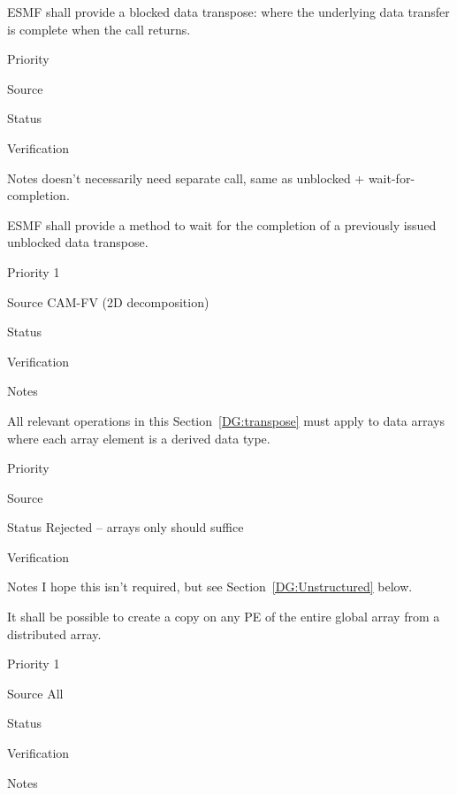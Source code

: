 
ESMF shall provide a blocked data transpose: where the underlying
data transfer is complete when the call returns.

\begin{reqlist}
\item[Priority]
\item[Source]
\item[Status]
\item[Verification]
\item[Notes] doesn't necessarily need separate call, same as unblocked
  + wait-for-completion.
\end{reqlist}


ESMF shall provide a method to wait for the completion of a previously
issued unblocked data transpose.

\begin{reqlist}
\item[Priority] 1
\item[Source] CAM-FV (2D decomposition)
\item[Status]
\item[Verification]
\item[Notes]
\end{reqlist}


All relevant operations in this Section~\ref{DG:transpose} must apply to
data arrays where each array element is a derived data type.

\begin{reqlist}
\item[Priority]
\item[Source]
\item[Status] Rejected -- arrays only should suffice
\item[Verification]
\item[Notes] I hope this isn't required, but see
  Section~\ref{DG:Unstructured} below.
\end{reqlist}


It shall be possible to create a copy on any PE of the entire global
array from a distributed array.

\begin{reqlist}
\item[Priority] 1
\item[Source] All
\item[Status]
\item[Verification]
\item[Notes] 
\end{reqlist}

